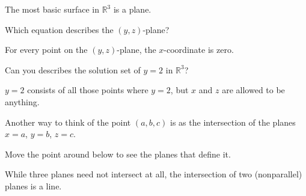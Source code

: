 \documentclass{ximera}
\begin{document}
The most basic surface in $\mathbb{R}^3$ is a plane.

\begin{question}
  Which equation describes the $(y,z)$-plane?
  \begin{prompt}
  \begin{multipleChoice}
  \end{multipleChoice}
  \begin{hint}
    For every point on the $(y,z)$-plane, the $x$-coordinate is zero.
  \end{hint}
  \end{prompt}
\end{question}

\begin{question}
  Can you describes the solution set of $y=2$ in $\mathbb{R}^3$?
  \begin{prompt}
  \begin{multipleChoice}
  \end{multipleChoice}
  \begin{hint}
    $y=2$ consists of all those points where $y=2$, but $x$ and
    $z$ are allowed to be anything.  
  \end{hint}
  \end{prompt}
\end{question}


Another way to think of the point $(a,b,c)$ is as the intersection of
the planes $x=a$, $y=b$, $z=c$.

\begin{onlineOnly}
  Move the point around below to see the planes that define it.

  \begin{center}
  \end{center}
\end{onlineOnly}


While three planes need not intersect at all, the intersection of two
(nonparallel) planes is a line.
\end{document}
